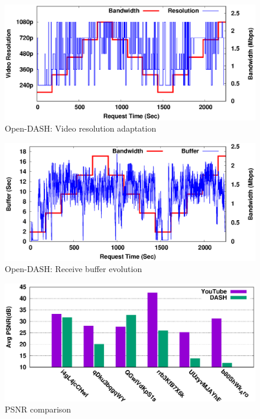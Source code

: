 \begin{figure}[!t]
	\centering
	\includegraphics[scale=0.7]{img/replay/resolutionchange}
	\caption{Open-DASH: Video resolution adaptation}
	\label{fig:reply-reso}
\end{figure}

\begin{figure}[!t]
	\centering
	\includegraphics[scale=0.7]{img/replay/bufferchange}
	\caption{Open-DASH: Receive buffer evolution}
	\label{fig:buf_reply}
\end{figure}

\begin{figure}[!t]
	\centering
	\includegraphics[scale=0.7]{img/plot_qoe}
	\caption{PSNR comparison}
	\label{fig:qoe_ytds}
\end{figure}


